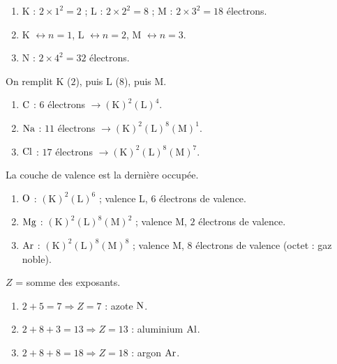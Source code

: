 \documentclass[11pt,a4paper]{article}
\begin{document}
\begin{corrige}
\begin{enumerate}[label=\alph*)]
  \item K : $2\times 1^2 = 2$ ; L : $2\times 2^2 = 8$ ; M : $2\times 3^2 = 18$ électrons.
  \item K $\leftrightarrow n=1$, L $\leftrightarrow n=2$, M $\leftrightarrow n=3$.
  \item N : $2\times 4^2 = 32$ électrons.
\end{enumerate}
\end{corrige}

\begin{corrige}
On remplit K ($2$), puis L ($8$), puis M.
\begin{enumerate}[label=\alph*)]
  \item $\ce{C}$ : $6$ électrons $\to (\mathrm{K})^2(\mathrm{L})^4$.
  \item $\ce{Na}$ : $11$ électrons $\to (\mathrm{K})^2(\mathrm{L})^8(\mathrm{M})^1$.
  \item $\ce{Cl}$ : $17$ électrons $\to (\mathrm{K})^2(\mathrm{L})^8(\mathrm{M})^7$.
\end{enumerate}
\end{corrige}

\begin{corrige}
La couche de valence est la dernière occupée.
\begin{enumerate}[label=\alph*)]
  \item $\ce{O}$ : $(\mathrm{K})^2(\mathrm{L})^6$ ; valence L, \textbf{$6$} électrons de valence.
  \item $\ce{Mg}$ : $(\mathrm{K})^2(\mathrm{L})^8(\mathrm{M})^2$ ; valence M, \textbf{$2$} électrons de valence.
  \item $\ce{Ar}$ : $(\mathrm{K})^2(\mathrm{L})^8(\mathrm{M})^8$ ; valence M, \textbf{$8$} électrons de
        valence (octet : gaz noble).
\end{enumerate}
\end{corrige}

\begin{corrige}
$Z$ = somme des exposants.
\begin{enumerate}[label=\alph*)]
  \item $2+5 = 7 \Rightarrow Z = 7$ : azote $\ce{N}$.
  \item $2+8+3 = 13 \Rightarrow Z = 13$ : aluminium $\ce{Al}$.
  \item $2+8+8 = 18 \Rightarrow Z = 18$ : argon $\ce{Ar}$.
\end{enumerate}
\end{corrige}
\end{document}
